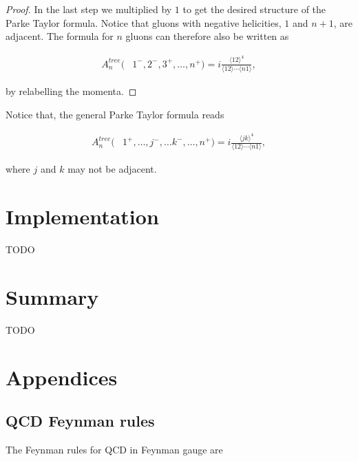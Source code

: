 \documentclass{article}
\theoremstyle{definition}
\numberwithin{equation}{section}
\begin{document}
\begin{proof}
In the last step we multiplied by $1$ to get the desired structure of the Parke Taylor formula. Notice that gluons with negative helicities, $1$ and $n+1$, are adjacent. The formula for $n$ gluons can therefore also be written as

\begin{align}
    A_n^{tree}(&1^{-}, 2^{-}, 3^{+}, \dots , n^{+}) = i \frac{ \langle 12 \rangle^4 }{ \langle 12 \rangle \cdots \langle n1 \rangle },
\end{align}

by relabelling the momenta.

\end{proof}

Notice that, the general Parke Taylor formula reads

\begin{align}
    A_n^{tree}(&1^{+}, \dots, j^{-}, \dots k^{-}, \dots, n^{+}) = i \frac{ \langle jk \rangle^4 }{ \langle 12 \rangle \cdots \langle n1 \rangle },
\end{align}

where $j$ and $k$ may not be adjacent.  

\section{Implementation}

TODO

\section{Summary}

TODO

\newpage




\newpage

\appendix
\section*{Appendices}
\renewcommand{\thesubsection}{\Alph{subsection}}

\subsection{QCD Feynman rules}
\label{sec:frules}

The Feynman rules for QCD in Feynman gauge are \cite{mangano99}
\end{document}
